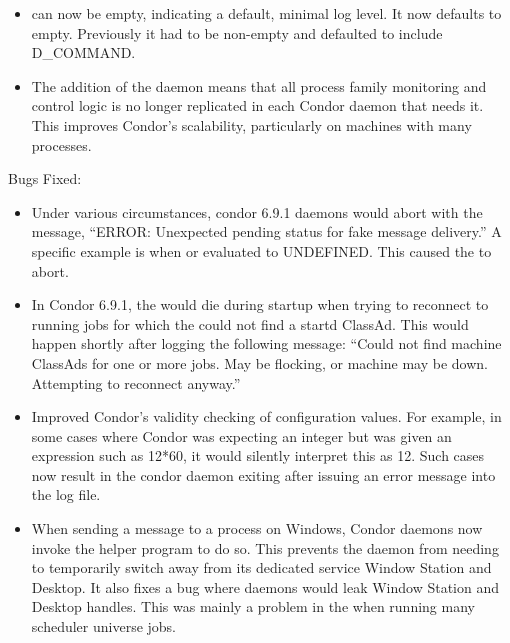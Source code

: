 \begin{itemize}
\item {} can now be empty, indicating a default, minimal
log level. It now defaults to empty.
Previously it had to be non-empty and defaulted to include D\_COMMAND.

\item The addition of the  daemon means that all process
family monitoring and control logic is no longer replicated in each
Condor daemon that needs it. This improves Condor's scalability,
particularly on machines with many processes.

\end{itemize}

\noindent Bugs Fixed:

\begin{itemize}

\item Under various circumstances, condor 6.9.1 daemons would abort
with the message, ``ERROR: Unexpected pending status for fake message
delivery.''  A specific example is when  or
 evaluated to UNDEFINED.  This caused the
 to abort.

\item In Condor 6.9.1, the  would die during startup
when trying to reconnect to running jobs for which the 
could not find a startd ClassAd.  This would happen shortly after
logging the following message: ``Could not find machine ClassAds for
one or more jobs.  May be flocking, or machine may be down.
Attempting to reconnect anyway.''

\item Improved Condor's validity checking of configuration values.
For example, in some cases where Condor was expecting an integer but
was given an expression such as 12*60, it would silently interpret
this as 12.  Such cases now result in the condor daemon exiting
after issuing an error message into the log file.

\item When sending a  message to a process on Windows,
Condor daemons now invoke the helper program  to do
so. This prevents the daemon from needing to temporarily switch away
from its dedicated service Window Station and Desktop. It also fixes a
bug where daemons would leak Window Station and Desktop handles. This
was mainly a problem in the  when running many scheduler
universe jobs.

\end{itemize}

